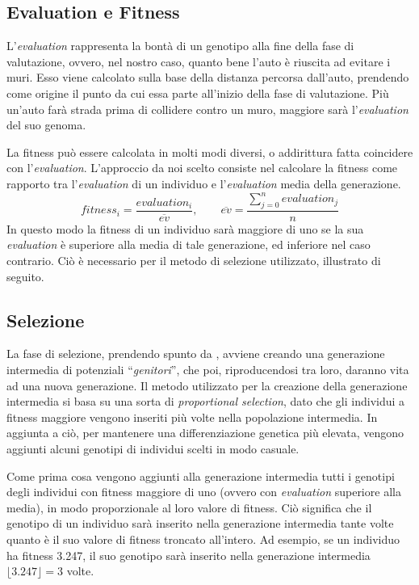 \documentclass[a4paper,12pt]{article}
\begin{document}
\subsection*{Evaluation e Fitness} \label{evFitness}
L'\emph{evaluation} rappresenta la bontà di un genotipo alla fine della fase di valutazione, ovvero, nel nostro caso, quanto bene l'auto è riuscita ad evitare i muri. Esso viene calcolato sulla base della distanza percorsa dall'auto, prendendo come origine il punto da cui essa parte all'inizio della fase di valutazione. Più un'auto farà strada prima di collidere contro un muro, maggiore sarà l'\emph{evaluation} del suo genoma. 

La fitness può essere calcolata in molti modi diversi, o addirittura fatta coincidere con l'\emph{evaluation}. L'approccio da noi scelto consiste nel calcolare la fitness come rapporto tra l'\emph{evaluation} di un individuo e l'\emph{evaluation} media della generazione. 
\begin{equation}
	fitness_i = \frac{evaluation_i}{\overline{ev}}, \hspace{2em} \overline{ev} = \frac{\sum_{j = 0}^{n} evaluation_j }{n}
\end{equation}
In questo modo la fitness di un individuo sarà maggiore di uno se la sua \emph{evaluation} è superiore alla media di tale generazione, ed inferiore nel caso contrario. Ciò è necessario per il metodo di selezione utilizzato, illustrato di seguito.
\subsection*{Selezione}
La fase di selezione, prendendo spunto da \cite{arztRepo}, avviene creando una generazione intermedia di potenziali ``\emph{genitori}'', che poi, riproducendosi tra loro, daranno vita ad una nuova generazione. Il metodo utilizzato per la creazione della generazione intermedia si basa su una sorta di \emph{proportional selection}, dato che gli individui a fitness maggiore vengono inseriti più volte nella popolazione intermedia. In aggiunta a ciò, per mantenere una differenziazione genetica più elevata, vengono aggiunti alcuni genotipi di individui scelti in modo casuale.  

Come prima cosa vengono aggiunti alla generazione intermedia tutti i genotipi degli individui con fitness maggiore di uno (ovvero con \emph{evaluation} superiore alla media), in modo proporzionale al loro valore di fitness. Ciò significa che il genotipo di un individuo sarà inserito nella generazione intermedia tante volte quanto è il suo valore di fitness troncato all'intero. Ad esempio, se un individuo ha fitness 3.247, il suo genotipo sarà inserito nella generazione intermedia $\lfloor3.247\rfloor = 3$ volte. 
\end{document}
